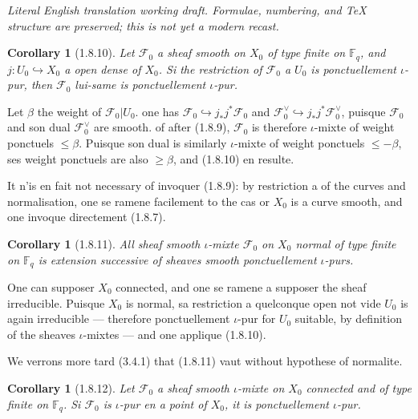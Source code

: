 \documentclass[12pt,a4paper]{article}
\theoremstyle{plain}
\newtheorem{corollary}[theorem]{Corollary}
\theoremstyle{definition}
\theoremstyle{remark}
\newcommand{\FF}{{\mathbb{F}}}
\begin{document}
\begin{center}\small\emph{Literal English translation working draft. Formulae, numbering, and TeX structure are preserved; this is not yet a modern recast.}\end{center}
\vspace{0.5em}

\setcounter{section}{1}



\begin{corollary}[1.8.10]
Let $\mathscr{F}_0$ a sheaf smooth on $X_0$ of type finite on $\FF_q$, and $j : U_0 \hookrightarrow X_0$ a open dense of $X_0$. Si the restriction of $\mathscr{F}_0$ a $U_0$ is ponctuellement $\iota$-pur, then $\mathscr{F}_0$ lui-same is ponctuellement $\iota$-pur.
\end{corollary}

Let $\beta$ the weight of $\mathscr{F}_0|U_0$. one has $\mathscr{F}_0 \hookrightarrow j_*j^*\mathscr{F}_0$ and $\mathscr{F}_0^\vee \hookrightarrow j_*j^*\mathscr{F}_0^\vee$, puisque $\mathscr{F}_0$ and son dual $\mathscr{F}_0^\vee$ are smooth. of after (1.8.9), $\mathscr{F}_0$ is therefore $\iota$-mixte of weight ponctuels $\leq \beta$. Puisque son dual is similarly $\iota$-mixte of weight ponctuels $\leq -\beta$, ses weight ponctuels are also $\geq \beta$, and (1.8.10) en resulte.

It n'is en fait not necessary of invoquer (1.8.9): by restriction a of the curves and normalisation, one se ramene facilement to the cas or $X_0$ is a curve smooth, and one invoque directement (1.8.7).

\begin{corollary}[1.8.11]
All sheaf smooth $\iota$-mixte $\mathscr{F}_0$ on $X_0$ normal of type finite on $\FF_q$ is extension successive of sheaves smooth ponctuellement $\iota$-purs.
\end{corollary}

One can supposer $X_0$ connected, and one se ramene a supposer the sheaf irreducible. Puisque $X_0$ is normal, sa restriction a quelconque open not vide $U_0$ is again irreducible --- therefore ponctuellement $\iota$-pur for $U_0$ suitable, by definition of the sheaves $\iota$-mixtes --- and one applique (1.8.10).

We verrons more tard (3.4.1) that (1.8.11) vaut without hypothese of normalite.

\begin{corollary}[1.8.12]
Let $\mathscr{F}_0$ a sheaf smooth $\iota$-mixte on $X_0$ connected and of type finite on $\FF_q$. Si $\mathscr{F}_0$ is $\iota$-pur en a point of $X_0$, it is ponctuellement $\iota$-pur.
\end{corollary}
\end{document}
